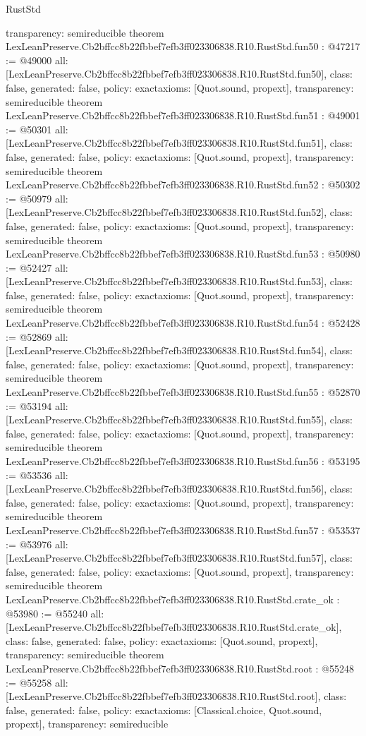 \begin{lexlean}{RustStd}
\begin{coremodule}
{  transparency: semireducible
}
theorem LexLeanPreserve.Cb2bffcc8b22fbbef7efb3ff023306838.R10.RustStd.fun50 : @47217 := @49000 {
  all: [LexLeanPreserve.Cb2bffcc8b22fbbef7efb3ff023306838.R10.RustStd.fun50],
  class: false,
  generated: false,
  policy: exact{axioms: [Quot.sound, propext]},
  transparency: semireducible
}
theorem LexLeanPreserve.Cb2bffcc8b22fbbef7efb3ff023306838.R10.RustStd.fun51 : @49001 := @50301 {
  all: [LexLeanPreserve.Cb2bffcc8b22fbbef7efb3ff023306838.R10.RustStd.fun51],
  class: false,
  generated: false,
  policy: exact{axioms: [Quot.sound, propext]},
  transparency: semireducible
}
theorem LexLeanPreserve.Cb2bffcc8b22fbbef7efb3ff023306838.R10.RustStd.fun52 : @50302 := @50979 {
  all: [LexLeanPreserve.Cb2bffcc8b22fbbef7efb3ff023306838.R10.RustStd.fun52],
  class: false,
  generated: false,
  policy: exact{axioms: [Quot.sound, propext]},
  transparency: semireducible
}
theorem LexLeanPreserve.Cb2bffcc8b22fbbef7efb3ff023306838.R10.RustStd.fun53 : @50980 := @52427 {
  all: [LexLeanPreserve.Cb2bffcc8b22fbbef7efb3ff023306838.R10.RustStd.fun53],
  class: false,
  generated: false,
  policy: exact{axioms: [Quot.sound, propext]},
  transparency: semireducible
}
theorem LexLeanPreserve.Cb2bffcc8b22fbbef7efb3ff023306838.R10.RustStd.fun54 : @52428 := @52869 {
  all: [LexLeanPreserve.Cb2bffcc8b22fbbef7efb3ff023306838.R10.RustStd.fun54],
  class: false,
  generated: false,
  policy: exact{axioms: [Quot.sound, propext]},
  transparency: semireducible
}
theorem LexLeanPreserve.Cb2bffcc8b22fbbef7efb3ff023306838.R10.RustStd.fun55 : @52870 := @53194 {
  all: [LexLeanPreserve.Cb2bffcc8b22fbbef7efb3ff023306838.R10.RustStd.fun55],
  class: false,
  generated: false,
  policy: exact{axioms: [Quot.sound, propext]},
  transparency: semireducible
}
theorem LexLeanPreserve.Cb2bffcc8b22fbbef7efb3ff023306838.R10.RustStd.fun56 : @53195 := @53536 {
  all: [LexLeanPreserve.Cb2bffcc8b22fbbef7efb3ff023306838.R10.RustStd.fun56],
  class: false,
  generated: false,
  policy: exact{axioms: [Quot.sound, propext]},
  transparency: semireducible
}
theorem LexLeanPreserve.Cb2bffcc8b22fbbef7efb3ff023306838.R10.RustStd.fun57 : @53537 := @53976 {
  all: [LexLeanPreserve.Cb2bffcc8b22fbbef7efb3ff023306838.R10.RustStd.fun57],
  class: false,
  generated: false,
  policy: exact{axioms: [Quot.sound, propext]},
  transparency: semireducible
}
theorem LexLeanPreserve.Cb2bffcc8b22fbbef7efb3ff023306838.R10.RustStd.crate_ok : @53980 := @55240 {
  all: [LexLeanPreserve.Cb2bffcc8b22fbbef7efb3ff023306838.R10.RustStd.crate_ok],
  class: false,
  generated: false,
  policy: exact{axioms: [Quot.sound, propext]},
  transparency: semireducible
}
theorem LexLeanPreserve.Cb2bffcc8b22fbbef7efb3ff023306838.R10.RustStd.root : @55248 := @55258 {
  all: [LexLeanPreserve.Cb2bffcc8b22fbbef7efb3ff023306838.R10.RustStd.root],
  class: false,
  generated: false,
  policy: exact{axioms: [Classical.choice, Quot.sound, propext]},
  transparency: semireducible
}


\end{coremodule}
\end{lexlean}
